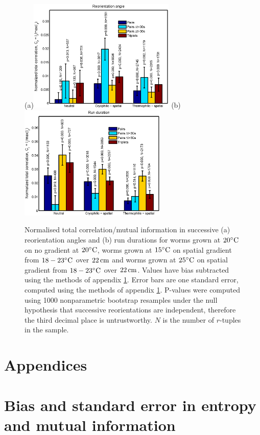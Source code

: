 \documentclass[12pt]{article}
\begin{document}
\begin{figure}
  \begin{center}
    (a)\includegraphics[width=7cm]{reoangle3.eps}
    (b)\includegraphics[width=7cm]{rundur3.eps}
  \end{center}
  \caption[Normalised total correlation/mutual information (continuous).]{Normalised total correlation/mutual information in successive (a) reorientation angles and (b) run durations for worms grown at $20^\circ\mathrm{C}$ on no gradient at $20^\circ\mathrm{C}$, worms grown at $15^\circ\mathrm{C}$ on spatial gradient from $18-23^\circ\mathrm{C}$ over $22\,\mathrm{cm}$ and worms grown at $25^\circ\mathrm{C}$ on spatial gradient from $18-23^\circ\mathrm{C}$ over $22\,\mathrm{cm}$. Values have bias subtracted using the methods of appendix \ref{sec:stderr}. Error bars are one standard error, computed using the methods of appendix \ref{sec:stderr}. P-values were computed using 1000 nonparametric bootstrap resamples under the null hypothesis that successive reorientations are independent, therefore the third decimal place is untrustworthy. $N$ is the number of $r$-tuples in the sample.} \label{fig:ctsresults}
\end{figure}




\appendix\section*{Appendices}

\section{Bias and standard error in entropy and mutual information}\label{sec:stderr}
\end{document}
